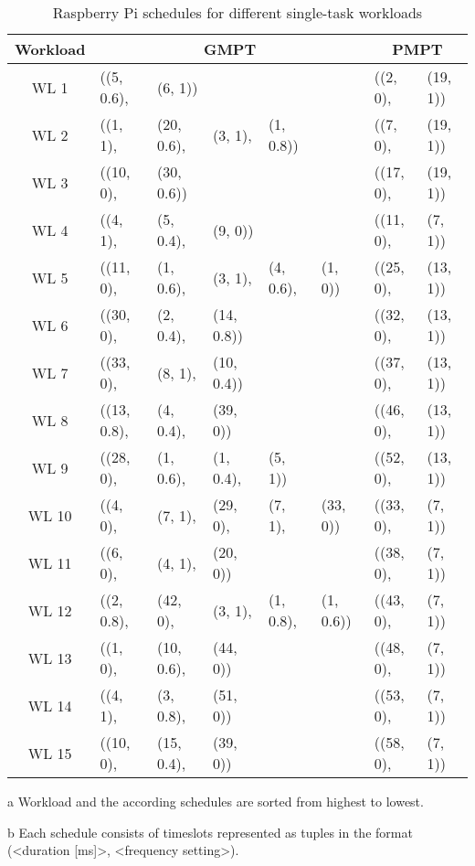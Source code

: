 \begin{table}[htpb]
 \centering
 \begin{threeparttable}
 \setlength\tabcolsep{3pt}
 \caption[Single-Task Pi schedules]{Raspberry Pi schedules for different single-task workloads}\label{app:t_smpt_pi}
 \begin{tabular}{||c||l l l l l|l l||} 
 \hline
 Workload\tnote{a} & \multicolumn{5}{c|}{GMPT\tnote{b}} & \multicolumn{2}{c||}{PMPT\tnote{b}} \\ [0.5ex]  
 \hline\hline
WL 1 & ((5, 0.6), & (6, 1)) & & & & ((2, 0), & (19, 1))\\
\hline
WL 2 & ((1, 1), & (20, 0.6), & (3, 1), & (1, 0.8)) & & ((7, 0), & (19, 1))\\
\hline
WL 3 & ((10, 0), & (30, 0.6)) & & & & ((17, 0), & (19, 1))\\
\hline
WL 4 & ((4, 1), & (5, 0.4), & (9, 0)) & & & ((11, 0), & (7, 1))\\
\hline
WL 5 & ((11, 0), & (1, 0.6), & (3, 1), & (4, 0.6), & (1, 0)) & ((25, 0), & (13, 1))\\
\hline
WL 6 & ((30, 0), & (2, 0.4), & (14, 0.8)) & & & ((32, 0), & (13, 1))\\
\hline
WL 7 & ((33, 0), & (8, 1), & (10, 0.4)) & & & ((37, 0), & (13, 1))\\
\hline
WL 8 & ((13, 0.8), & (4, 0.4), & (39, 0)) & & & ((46, 0), & (13, 1))\\
\hline
WL 9 & ((28, 0), & (1, 0.6), & (1, 0.4), & (5, 1)) & & ((52, 0), & (13, 1))\\
\hline
WL 10 & ((4, 0), & (7, 1), & (29, 0), & (7, 1), & (33, 0)) & ((33, 0), & (7, 1))\\
\hline
WL 11 & ((6, 0), & (4, 1), & (20, 0)) & & & ((38, 0), & (7, 1))\\
\hline
WL 12 & ((2, 0.8), & (42, 0), & (3, 1), & (1, 0.8), & (1, 0.6)) & ((43, 0), & (7, 1))\\
\hline
WL 13 & ((1, 0), & (10, 0.6), & (44, 0)) & & & ((48, 0), & (7, 1))\\
\hline
WL 14 & ((4, 1), & (3, 0.8), & (51, 0)) & & & ((53, 0), & (7, 1))\\
\hline
WL 15 & ((10, 0), & (15, 0.4), & (39, 0)) & & & ((58, 0), & (7, 1))\\
\hline
\end{tabular}
\begin{tablenotes}
\item [a] Workload and the according schedules are sorted from highest to lowest.
\item [b] Each schedule consists of timeslots represented as tuples in the format\\(<duration [ms]>, <frequency setting>).
\end{tablenotes}
\end{threeparttable}
\end{table}
